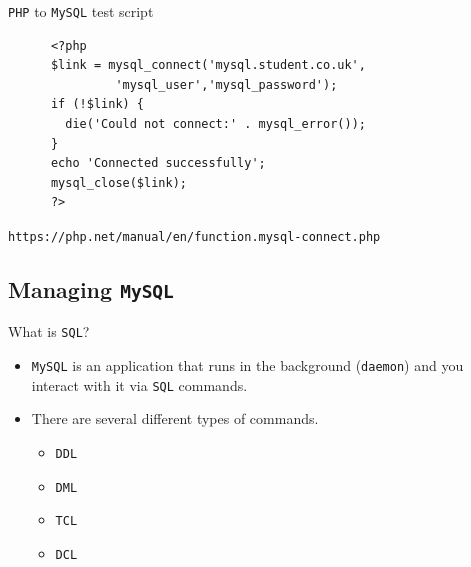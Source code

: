 \documentclass[xcolor=table,aspectratio=169]{beamer}
\begin{document}
\begin{frame}[fragile]{\texttt{PHP} to \texttt{MySQL} test script}
  \begin{tcolorbox}
    \lstset{
      basicstyle=\tiny\ttfamily,
    }
    \begin{lstlisting}
      <?php
      $link = mysql_connect('mysql.student.co.uk',
               'mysql_user','mysql_password');
      if (!$link) {
        die('Could not connect:' . mysql_error());
      }
      echo 'Connected successfully';
      mysql_close($link);
      ?>
    \end{lstlisting}
  \end{tcolorbox}
  \begin{tcolorbox}
    \small\texttt{https://php.net/manual/en/function.mysql-connect.php}
  \end{tcolorbox}
\end{frame}

\subsection{Managing \texttt{MySQL}}
\begin{frame}{What is \texttt{SQL}?}
  \begin{itemize}
    \item \texttt{MySQL} is an application that runs in the background (\texttt{daemon}) and you interact with it via \texttt{SQL} commands.
    \item There are several different types of commands.
      \begin{itemize}
        \item \texttt{DDL}
        \item \texttt{DML}
        \item \texttt{TCL}
        \item \texttt{DCL}
      \end{itemize}
  \end{itemize}
\end{frame}
\end{document}
